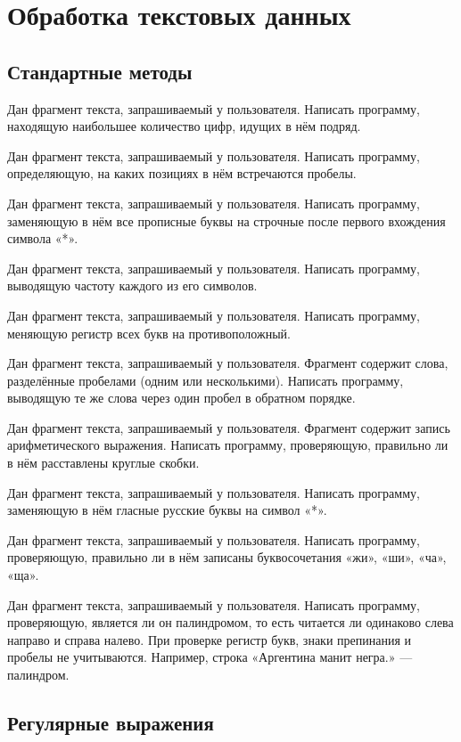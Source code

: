 \section{Обработка текстовых данных}

\subsection{Стандартные методы}

\task Дан фрагмент текста, запрашиваемый у пользователя. Написать
программу, находящую наибольшее количество цифр, идущих в нём подряд.

\task Дан фрагмент текста, запрашиваемый у пользователя. Написать
программу, определяющую, на каких позициях в нём встречаются пробелы.

\task Дан фрагмент текста, запрашиваемый у пользователя. Написать
программу, заменяющую в нём все прописные буквы на строчные после
первого вхождения символа «*».

\task Дан фрагмент текста, запрашиваемый у пользователя. Написать
программу, выводящую частоту каждого из его символов.

\task Дан фрагмент текста, запрашиваемый у пользователя. Написать
программу, меняющую регистр всех букв на противоположный.

\task Дан фрагмент текста, запрашиваемый у пользователя. Фрагмент
содержит слова, разделённые пробелами (одним или несколькими).
Написать программу, выводящую те же слова через один пробел в
обратном порядке.

\task Дан фрагмент текста, запрашиваемый у пользователя. Фрагмент
содержит запись арифметического выражения. Написать программу,
проверяющую, правильно ли в нём расставлены круглые скобки.

\task Дан фрагмент текста, запрашиваемый у пользователя. Написать
программу, заменяющую в нём гласные русские буквы на символ «*».

\task Дан фрагмент текста, запрашиваемый у пользователя. Написать
программу, проверяющую, правильно ли в нём записаны буквосочетания
«жи», «ши», «ча», «ща».

\task Дан фрагмент текста, запрашиваемый у пользователя. Написать
программу, проверяющую, является ли он палиндромом, то есть читается
ли одинаково слева направо и справа налево. При проверке регистр букв,
знаки препинания и пробелы не учитываются. Например, строка «Аргентина
манит негра.» — палиндром.

\subsection{Регулярные выражения}

